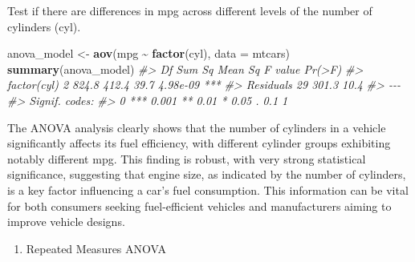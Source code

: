 \documentclass[
]{book}
\newenvironment{Shaded}{\begin{snugshade}}{\end{snugshade}}
\newcommand{\AttributeTok}[1]{\textcolor[rgb]{0.13,0.29,0.53}{#1}}
\newcommand{\CommentTok}[1]{\textcolor[rgb]{0.56,0.35,0.01}{\textit{#1}}}
\newcommand{\FunctionTok}[1]{\textcolor[rgb]{0.13,0.29,0.53}{\textbf{#1}}}
\newcommand{\NormalTok}[1]{#1}
\newcommand{\OtherTok}[1]{\textcolor[rgb]{0.56,0.35,0.01}{#1}}
\newcommand{\SpecialCharTok}[1]{\textcolor[rgb]{0.81,0.36,0.00}{\textbf{#1}}}
\providecommand{\tightlist}{%
  \setlength{\itemsep}{0pt}\setlength{\parskip}{0pt}}
\begin{document}
Test if there are differences in mpg across different levels of the number of cylinders (cyl).

\begin{Shaded}
\begin{Highlighting}[]
\NormalTok{anova\_model }\OtherTok{\textless{}{-}} \FunctionTok{aov}\NormalTok{(mpg }\SpecialCharTok{\textasciitilde{}} \FunctionTok{factor}\NormalTok{(cyl), }\AttributeTok{data =}\NormalTok{ mtcars)}
\FunctionTok{summary}\NormalTok{(anova\_model)}
\CommentTok{\#\textgreater{}             Df Sum Sq Mean Sq F value   Pr(\textgreater{}F)    }
\CommentTok{\#\textgreater{} factor(cyl)  2  824.8   412.4    39.7 4.98e{-}09 ***}
\CommentTok{\#\textgreater{} Residuals   29  301.3    10.4                     }
\CommentTok{\#\textgreater{} {-}{-}{-}}
\CommentTok{\#\textgreater{} Signif. codes:  }
\CommentTok{\#\textgreater{} 0 \textquotesingle{}***\textquotesingle{} 0.001 \textquotesingle{}**\textquotesingle{} 0.01 \textquotesingle{}*\textquotesingle{} 0.05 \textquotesingle{}.\textquotesingle{} 0.1 \textquotesingle{} \textquotesingle{} 1}
\end{Highlighting}
\end{Shaded}

The ANOVA analysis clearly shows that the number of cylinders in a vehicle significantly affects its fuel efficiency, with different cylinder groups exhibiting notably different mpg. This finding is robust, with very strong statistical significance, suggesting that engine size, as indicated by the number of cylinders, is a key factor influencing a car's fuel consumption. This information can be vital for both consumers seeking fuel-efficient vehicles and manufacturers aiming to improve vehicle designs.

\begin{enumerate}
\def\labelenumi{\alph{enumi}.}
\setcounter{enumi}{4}
\tightlist
\item
  Repeated Measures ANOVA
\end{enumerate}
\end{document}
